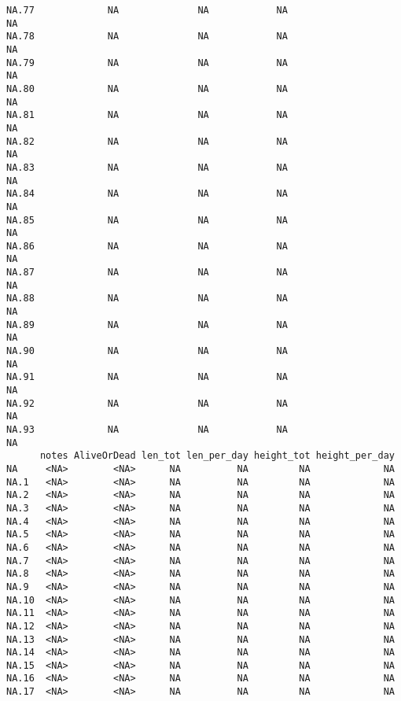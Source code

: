 \documentclass[
  letterpaper,
  DIV=11,
  numbers=noendperiod]{scrartcl}
\begin{document}
\begin{verbatim}
NA.77             NA              NA            NA                        NA
NA.78             NA              NA            NA                        NA
NA.79             NA              NA            NA                        NA
NA.80             NA              NA            NA                        NA
NA.81             NA              NA            NA                        NA
NA.82             NA              NA            NA                        NA
NA.83             NA              NA            NA                        NA
NA.84             NA              NA            NA                        NA
NA.85             NA              NA            NA                        NA
NA.86             NA              NA            NA                        NA
NA.87             NA              NA            NA                        NA
NA.88             NA              NA            NA                        NA
NA.89             NA              NA            NA                        NA
NA.90             NA              NA            NA                        NA
NA.91             NA              NA            NA                        NA
NA.92             NA              NA            NA                        NA
NA.93             NA              NA            NA                        NA
      notes AliveOrDead len_tot len_per_day height_tot height_per_day
NA     <NA>        <NA>      NA          NA         NA             NA
NA.1   <NA>        <NA>      NA          NA         NA             NA
NA.2   <NA>        <NA>      NA          NA         NA             NA
NA.3   <NA>        <NA>      NA          NA         NA             NA
NA.4   <NA>        <NA>      NA          NA         NA             NA
NA.5   <NA>        <NA>      NA          NA         NA             NA
NA.6   <NA>        <NA>      NA          NA         NA             NA
NA.7   <NA>        <NA>      NA          NA         NA             NA
NA.8   <NA>        <NA>      NA          NA         NA             NA
NA.9   <NA>        <NA>      NA          NA         NA             NA
NA.10  <NA>        <NA>      NA          NA         NA             NA
NA.11  <NA>        <NA>      NA          NA         NA             NA
NA.12  <NA>        <NA>      NA          NA         NA             NA
NA.13  <NA>        <NA>      NA          NA         NA             NA
NA.14  <NA>        <NA>      NA          NA         NA             NA
NA.15  <NA>        <NA>      NA          NA         NA             NA
NA.16  <NA>        <NA>      NA          NA         NA             NA
NA.17  <NA>        <NA>      NA          NA         NA             NA

\end{verbatim}
\end{document}
